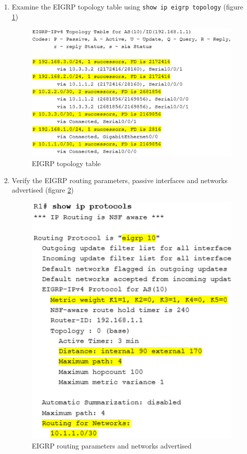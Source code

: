 \begin{enumerate}
\item Examine the EIGRP topology table using \verb|show ip eigrp topology| (figure \ref{EIGRPtopologyTable})	
	\begin{figure}[hbtp]
			\caption{EIGRP topology table}\label{EIGRPtopologyTable}
			\centering
			\includegraphics[scale=0.8]{pictures/EIGRPtopologyTable.PNG}
			\end{figure}

\item Verify the EIGRP routing parameters, passive interfaces and networks advertised (figure \ref{EIGRPparameters})
	\begin{figure}[hbtp]
	\caption{EIGRP routing parameters and networks advertised}\label{EIGRPparameters}
	\centering
	\includegraphics[scale=0.8]{pictures/EIGRPparameters.PNG}
	\end{figure}
						
\end{enumerate}

